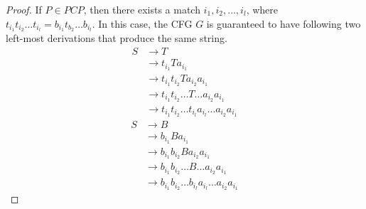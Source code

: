 \documentclass[11pt]{article}
\begin{document}
\begin{proof}
If $P \in PCP$, then there exists a match $i_1, i_2,\dots,i_l$, where $t_{i_{1}}t_{i_{2}} \dots t_{i_{l}} = b_{i_{1}}t_{b_{2}} \dots b_{i_{l}}$. In this case, the CFG $G$ is guaranteed to have following two left-most derivations that produce the same string.
\begin{align*}
S &\rightarrow T \\
&\rightarrow t_{i_{1}}Ta_{i_{1}} \\
&\rightarrow t_{i_{1}} t_{i_{2}} T a_{i_{2}} a_{i_{1}} \\
&\rightarrow t_{i_{1}} t_{i_{2}} \dots T \dots a_{i_{2}} a_{i_{1}} \\
&\rightarrow t_{i_{1}} t_{i_{2}} \dots t_{i_{l}}a_{i_{l}} \dots a_{i_{2}} a_{i_{1}}
\end{align*}
\begin{align*}
S &\rightarrow B \\
&\rightarrow b_{i_{1}}B a_{i_{1}} \\
&\rightarrow b_{i_{1}} b_{i_{2}} B a_{i_{2}} a_{i_{1}} \\
&\rightarrow b_{i_{1}} b_{i_{2}} \dots B \dots a_{i_{2}} a_{i_{1}} \\
&\rightarrow b_{i_{1}} b_{i_{2}} \dots b_{i_{l}}a_{i_{l}} \dots a_{i_{2}} a_{i_{1}}
\end{align*}
\end{proof}
\end{document}

